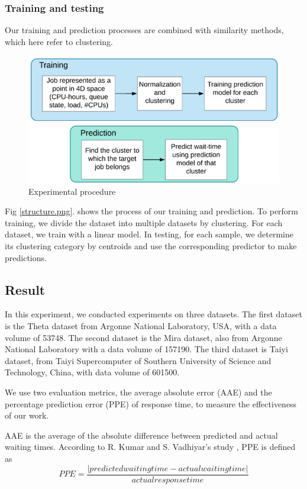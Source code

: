 \documentclass[conference,compsoc]{IEEEtran}
\begin{document}
\subsubsection{Training and testing}
Our training and prediction processes are combined with similarity methods, which here refer to clustering.
\begin{figure}[htbp]
	\centering
	\includegraphics[width=\linewidth,scale=1.00]{train.png}
	\caption{Experimental procedure}
	\label{train.png}
\end{figure}

Fig \ref{structure.png}. shows the process of our training and prediction. To perform training, we divide the dataset into multiple datasets by clustering. For each dataset, we train with a linear model. In testing, for each sample, we determine its clustering category by centroids and use the corresponding predictor to make predictions. 

\subsection{Result}
In this experiment, we conducted experiments on three datasets. The first dataset is the Theta dataset from Argonne National Laboratory, USA, with a data volume of 53748. The second dataset is the Mira dataset, also from Argonne National Laboratory with a data volume of 157190. The third dataset is Taiyi dataset, from Taiyi Supercomputer of Southern University of Science and Technology, China, with data volume of 601500.

We use two evaluation metrics, the average absolute error (AAE) and the percentage prediction error (PPE) of response time, to measure the effectiveness of our work. 

AAE is the average of the absolute difference between predicted and actual waiting times. According to R. Kumar and S. Vadhiyar's study \cite{kumarandvadhiyar}, PPE is defined as
$$
PPE=\frac{\left | predicted waiting time- actual waiting time \right |}{actual response time} 
$$
\end{document}
